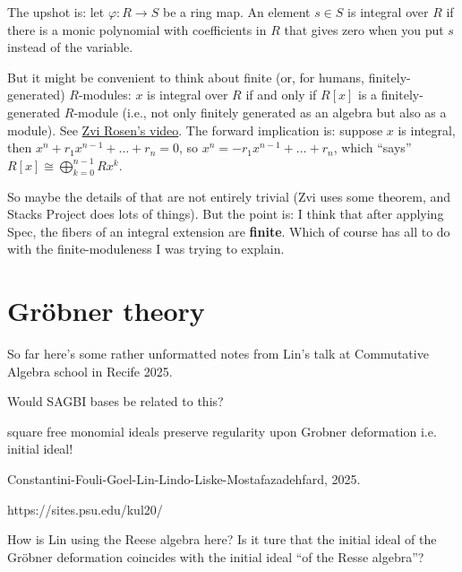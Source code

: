 \noindent
The upshot is: let $\varphi:R \to S$ be a ring map.
An element $s \in S$ is integral over $R$ if there
is a monic polynomial with coefficients in $R$
that gives zero when you put $s$ instead of the variable.

But it might be convenient to think about
finite (or, for humans, finitely-generated) $R$-modules:
$x$ is integral over $R$ if and only if $R[x]$
is a finitely-generated  $R$-module (i.e.,
not only finitely generated as an algebra
but also as a module).
See \href{
https://youtu.be/5fCHj80BQHw?si=o7tMC4tRsbBnwmJi}{Zvi Rosen's video}.
The forward implication is: suppose $x$ is integral,
then $x^n+r_1x^{n-1}+\ldots+r_n=0$, so
$x^n=-r_1x^{n-1}+\ldots+r_n$,
which ``says'' $R[x] \cong \bigoplus_{k=0}^{n-1}Rx^k$.

So maybe the details of that are not entirely trivial (Zvi uses some theorem,
and Stacks Project does lots of things).
But the point is: I think that after applying Spec,
the fibers of an integral extension are {\bf finite}.
Which of course has all to do with the finite-moduleness
I was trying to explain.




\section{Gröbner theory}
\label{section-grobner}

\noindent
So far here's some rather unformatted notes from
Lin's talk at Commutative Algebra school in Recife 2025.

Would SAGBI bases be related to this?

square free monomial ideals preserve regularity upon Grobner deformation
i.e. initial ideal!

Constantini-Fouli-Goel-Lin-Lindo-Liske-Mostafazadehfard, 2025.

https://sites.psu.edu/kul20/

How is Lin using the Reese algebra here?
Is it ture that the initial ideal of the Gröbner deformation
coincides with the initial ideal ``of the Resse algebra''?







